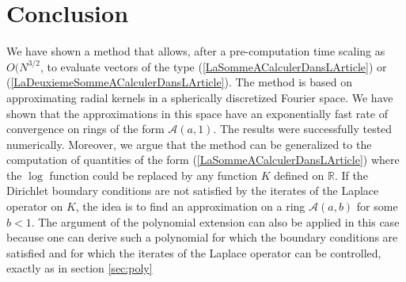 \documentclass[11pt,a4paper]{article}
\begin{document}
\section{Conclusion}
We have shown a method that allows, after a pre-computation time scaling as $O(N^{3/2}$, to evaluate vectors of the type (\ref{LaSommeACalculerDansLArticle})
 or (\ref{LaDeuxiemeSommeACalculerDansLArticle}). The method is based on approximating radial kernels in a spherically discretized Fourier space. We have shown that the approximations in this space have an exponentially fast rate of convergence on rings of the form $\mathcal{A}(a,1)$. The results were successfully tested numerically. Moreover, we argue that the method can be generalized to the computation of quantities of the form (\ref{LaSommeACalculerDansLArticle}) where the $\log$ function could be replaced by any function $K$ defined on $\mathbb{R}$. If the Dirichlet boundary conditions are not satisfied by the iterates of the Laplace operator on $K$, the idea is to find an approximation on a ring $\mathcal{A}(a,b)$ for some $b < 1$. The argument of the polynomial extension can also be applied in this case because one can derive such a polynomial for which the boundary conditions are satisfied and for which the iterates of the Laplace operator can be controlled, exactly as in section \ref{sec:poly} 
\pagebreak


 
\end{document}
